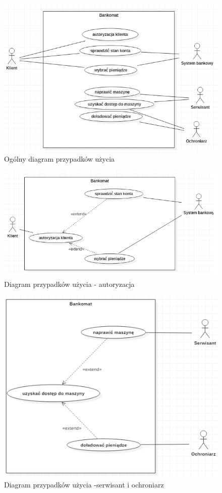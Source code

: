 \documentclass[a4paper, 11pt]{article}
\begin{document}
	\begin{figure}[H]%
			\includegraphics[scale=1.0]{usecase1.png}\caption{Ogólny diagram przypadków użycia}
	\end{figure}
	
	\begin{figure}[H]%
			\includegraphics[scale=0.9]{usecase2.png}\caption{Diagram przypadków użycia - autoryzacja}
	\end{figure}
	
	\begin{figure}[H]%
			\includegraphics[scale=1.0]{usecase3.png}\caption{Diagram przypadków użycia -serwisant i ochroniarz}
	\end{figure}
		
\end{document}
